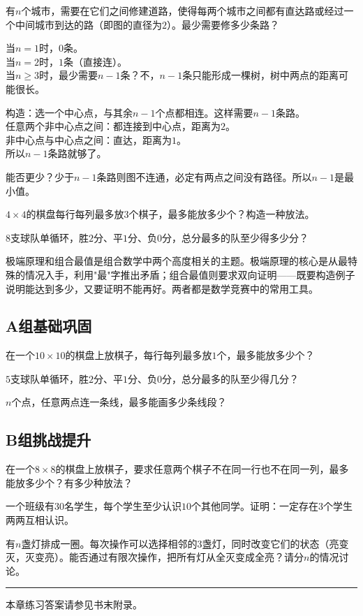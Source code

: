 \begin{example}
有$n$个城市，需要在它们之间修建道路，使得每两个城市之间都有直达路或经过一个中间城市到达的路（即图的直径为$2$）。最少需要修多少条路？
\end{example}
\begin{solution}
当$n=1$时，$0$条。\\
当$n=2$时，$1$条（直接连）。\\
当$n\ge3$时，最少需要$n-1$条？不，$n-1$条只能形成一棵树，树中两点的距离可能很长。

构造：选一个中心点，与其余$n-1$个点都相连。这样需要$n-1$条路。\\
任意两个非中心点之间：都连接到中心点，距离为$2$。\\
非中心点与中心点之间：直达，距离为$1$。\\
所以$n-1$条路就够了。

能否更少？少于$n-1$条路则图不连通，必定有两点之间没有路径。所以$n-1$是最小值。
\end{solution}

\begin{exercise}
\item $4\times4$的棋盘每行每列最多放$3$个棋子，最多能放多少个？构造一种放法。
\item $8$支球队单循环，胜$2$分、平$1$分、负$0$分，总分最多的队至少得多少分？
\end{exercise}


极端原理和组合最值是组合数学中两个高度相关的主题。极端原理的核心是从最特殊的情况入手，利用"最"字推出矛盾；组合最值则要求双向证明——既要构造例子说明能达到多少，又要证明不能再好。两者都是数学竞赛中的常用工具。


\subsection*{A组\quad 基础巩固}

\begin{exercise}
\item 在一个$10\times10$的棋盘上放棋子，每行每列最多放$1$个，最多能放多少个？
\item $5$支球队单循环，胜$2$分、平$1$分、负$0$分，总分最多的队至少得几分？
\item $n$个点，任意两点连一条线，最多能画多少条线段？
\end{exercise}

\subsection*{B组\quad 挑战提升}

\begin{exercise}
\item 在一个$8\times8$的棋盘上放棋子，要求任意两个棋子不在同一行也不在同一列，最多能放多少个？有多少种放法？
\item 一个班级有$30$名学生，每个学生至少认识$10$个其他同学。证明：一定存在$3$个学生两两互相认识。
\item 有$n$盏灯排成一圈。每次操作可以选择相邻的$3$盏灯，同时改变它们的状态（亮变灭，灭变亮）。能否通过有限次操作，把所有灯从全灭变成全亮？请分$n$的情况讨论。
\end{exercise}

\vfill
\noindent\rule{\textwidth}{0.4pt}
本章练习答案请参见书末附录。
